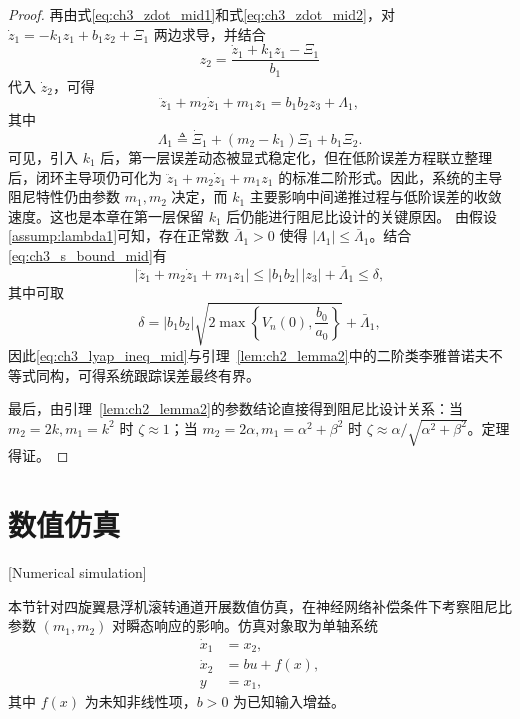 \begin{proof}
再由式\eqref{eq:ch3_zdot_mid1}和式\eqref{eq:ch3_zdot_mid2}，对 $\dot z_1=-k_1z_1+b_1z_2+\Xi_1$ 两边求导，并结合
\begin{equation}
	z_2=\frac{\dot z_1+k_1z_1-\Xi_1}{b_1}
\end{equation}
代入 $\dot z_2$，可得
\begin{equation}\label{eq:ch3_v2_eq_mid}
	\ddot z_1+m_2\dot z_1+m_1z_1=b_1b_2z_3+\Lambda_1,
\end{equation}
其中
\begin{equation}
	\Lambda_1\triangleq \dot\Xi_1+(m_2-k_1)\Xi_1+b_1\Xi_2.
\end{equation}
可见，引入 $k_1$ 后，第一层误差动态被显式稳定化，但在低阶误差方程联立整理后，闭环主导项仍可化为 $\ddot z_1+m_2\dot z_1+m_1z_1$ 的标准二阶形式。因此，系统的主导阻尼特性仍由参数 $m_1,m_2$ 决定，而 $k_1$ 主要影响中间递推过程与低阶误差的收敛速度。这也是本章在第一层保留 $k_1$ 后仍能进行阻尼比设计的关键原因。
由假设\ref{assump:lambda1}可知，存在正常数 $\bar\Lambda_1>0$ 使得 $|\Lambda_1|\le\bar\Lambda_1$。结合\eqref{eq:ch3_s_bound_mid}有
\begin{equation}\label{eq:ch3_lyap_ineq_mid}
	\left|\ddot z_1+m_2\dot z_1+m_1z_1\right|
	\le |b_1b_2|\,|z_3|+\bar\Lambda_1
	\le \delta,
\end{equation}
其中可取
\begin{equation}
	\delta=|b_1b_2|\sqrt{2\max\left\{V_n(0),\frac{b_0}{a_0}\right\}}+\bar\Lambda_1,
\end{equation}
因此\eqref{eq:ch3_lyap_ineq_mid}与引理~\ref{lem:ch2_lemma2}中的二阶类李雅普诺夫不等式同构，可得系统跟踪误差最终有界。

最后，由引理~\ref{lem:ch2_lemma2}的参数结论直接得到阻尼比设计关系：当 $m_2=2k,m_1=k^2$ 时 $\zeta\approx1$；当 $m_2=2\alpha,m_1=\alpha^2+\beta^2$ 时 $\zeta\approx\alpha/\sqrt{\alpha^2+\beta^2}$。定理得证。
\end{proof}

\section{数值仿真}[Numerical simulation]\label{sec:ch3_sim}

本节针对四旋翼悬浮机滚转通道开展数值仿真，在神经网络补偿条件下考察阻尼比参数 $(m_1,m_2)$ 对瞬态响应的影响。仿真对象取为单轴系统
\begin{subequations}\label{eq:ch2_sim_sys}
\begin{align}
\dot x_1 &= x_2,\\
\dot x_2 &= bu+f(x),\\
y &= x_1,
\end{align}
\end{subequations}
其中 $f(x)$ 为未知非线性项，$b>0$ 为已知输入增益。

